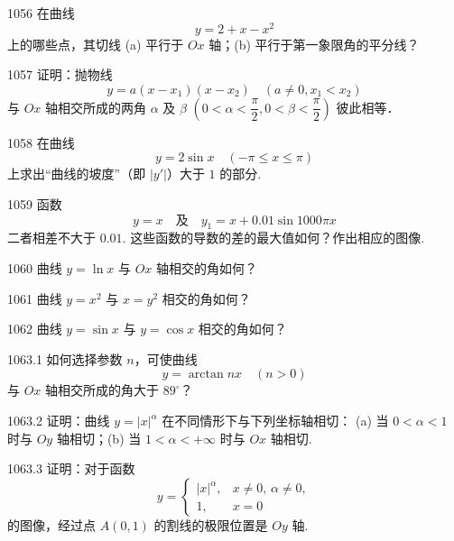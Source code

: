 \begin{prob}[M]{1056}
在曲线
\[
y = 2 + x - x^2
\]
上的哪些点，其切线 (a) 平行于 $Ox$ 轴；(b) 平行于第一象限角的平分线？
\end{prob}

\begin{prob}[M]{1057}
证明：抛物线
\[
y = a(x - x_1)(x - x_2) \quad (a \neq 0, x_1 < x_2)
\]
与 $Ox$ 轴相交所成的两角 $\alpha$ 及 $\beta$ $\left(0 < \alpha < \dfrac{\pi}{2}, 0 < \beta < \dfrac{\pi}{2}\right)$ 彼此相等．
\end{prob}

\begin{prob}[M]{1058}
在曲线
\[
y = 2\sin x \quad (-\pi \leqslant x \leqslant \pi)
\]
上求出“曲线的坡度”（即 $|y'|$）大于 $1$ 的部分.
\end{prob}

\begin{prob}[M]{1059}
函数
\[
y = x \quad \text{及} \quad y_1 = x + 0.01\sin 1000\pi x
\]
二者相差不大于 $0.01$. 这些函数的导数的差的最大值如何？作出相应的图像.
\end{prob}

\begin{prob}[S]{1060}
曲线 $y = \ln x$ 与 $Ox$ 轴相交的角如何？
\end{prob}

\begin{prob}[S]{1061}
曲线 $y = x^2$ 与 $x = y^2$ 相交的角如何？
\end{prob}

\begin{prob}[S]{1062}
曲线 $y = \sin x$ 与 $y = \cos x$ 相交的角如何？
\end{prob}

\begin{prob}[M]{1063.1}
如何选择参数 $n$，可使曲线
\[
y = \arctan nx \quad (n > 0)
\]
与 $Ox$ 轴相交所成的角大于 $89^\circ$？
\end{prob}

\begin{prob}[M]{1063.2}
证明：曲线 $y = |x|^\alpha$ 在不同情形下与下列坐标轴相切：
(a) 当 $0 < \alpha < 1$ 时与 $Oy$ 轴相切；\qquad (b) 当 $1 < \alpha < +\infty$ 时与 $Ox$ 轴相切.
\end{prob}

\begin{prob}[M]{1063.3}
证明：对于函数
\[
y = \begin{cases}
|x|^\alpha, & x \neq 0, \, \alpha \neq 0, \\
1, & x = 0
\end{cases}
\]
的图像，经过点 $A(0, 1)$ 的割线的极限位置是 $Oy$ 轴.
\end{prob}

